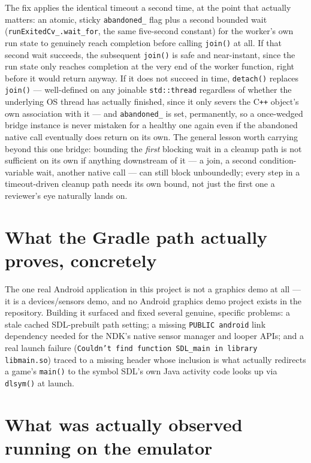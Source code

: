 The fix applies the identical timeout a second time, at the point that actually matters: an
atomic, sticky \texttt{abandoned\_} flag plus a second bounded wait
(\texttt{runExitedCv\_.wait\_for}, the same five-second constant) for the worker's own run
state to genuinely reach completion before calling \texttt{join()} at all. If that second wait
succeeds, the subsequent \texttt{join()} is safe and near-instant, since the run state only
reaches completion at the very end of the worker function, right before it would return
anyway. If it does not succeed in time, \texttt{detach()} replaces \texttt{join()} ---
well-defined on any joinable \texttt{std::thread} regardless of whether the underlying OS
thread has actually finished, since it only severs the C\texttt{++} object's own association
with it --- and \texttt{abandoned\_} is set, permanently, so a once-wedged bridge instance is
never mistaken for a healthy one again even if the abandoned native call eventually does
return on its own. The general lesson worth carrying beyond this one bridge: bounding the
\emph{first} blocking wait in a cleanup path is not sufficient on its own if anything
downstream of it --- a join, a second condition-variable wait, another native call --- can
still block unboundedly; every step in a timeout-driven cleanup path needs its own bound,
not just the first one a reviewer's eye naturally lands on.

\section{What the Gradle path actually proves, concretely}

The one real Android application in this project is not a graphics demo at all --- it is a
devices/sensors demo, and no Android graphics demo project exists in the repository. Building
it surfaced and fixed several genuine, specific problems: a stale cached SDL-prebuilt path
setting; a missing \texttt{PUBLIC android} link dependency needed for the NDK's native sensor
manager and looper APIs; and a real launch failure (\texttt{Couldn't find function SDL\_main
in library libmain.so}) traced to a missing header whose inclusion is what actually redirects
a game's \texttt{main()} to the symbol SDL's own Java activity code looks up via
\texttt{dlsym()} at launch.

\section{What was actually observed running on the emulator}


